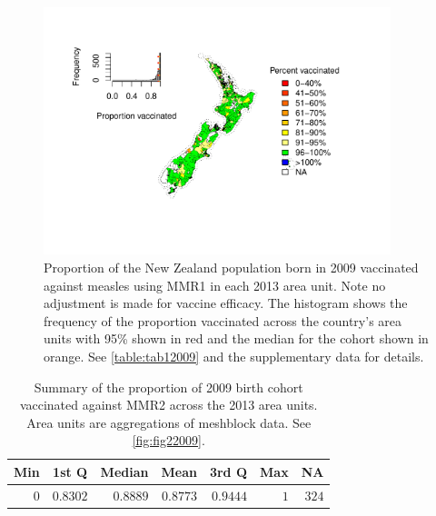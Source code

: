 \documentclass{article}
\begin{document}
\begin{figure}
\begin{center}
    \includegraphics[width=0.9\textwidth]{nir_census_MMR1_NIR_2009.pdf}
 \end{center}
    \caption{Proportion of the New Zealand population born in 2009 vaccinated against measles using MMR1 in each 2013 area unit. Note no adjustment is made for vaccine efficacy. The histogram shows the frequency of the proportion vaccinated across the country's area units with 95\% shown in red and the median for the cohort shown in orange. See \autoref{table:tab12009} and the supplementary data for details.}
\label{fig:fig12009}
\end{figure}

 \vspace{5mm} %
\begin{table}
\begin{center}
\begin{tabular}{rrrrrrr}
\hline\hline
\multicolumn{1}{c}{Min}&\multicolumn{1}{c}{1st Q}&\multicolumn{1}{c}{Median}&\multicolumn{1}{c}{Mean}&\multicolumn{1}{c}{3rd Q}&\multicolumn{1}{c}{Max}&\multicolumn{1}{c}{NA}\tabularnewline
\hline
$0$&$0.8302$&$0.8889$&$0.8773$&$0.9444$&$1$&$324$\tabularnewline
\hline
\end{tabular}\end{center}\caption{Summary of the proportion of 2009 birth cohort vaccinated against MMR2 across the 2013 area units. Area units are aggregations of meshblock data. See \autoref{fig:fig22009}.}
\label{table:tab22009}
\end{table}
\end{document}
